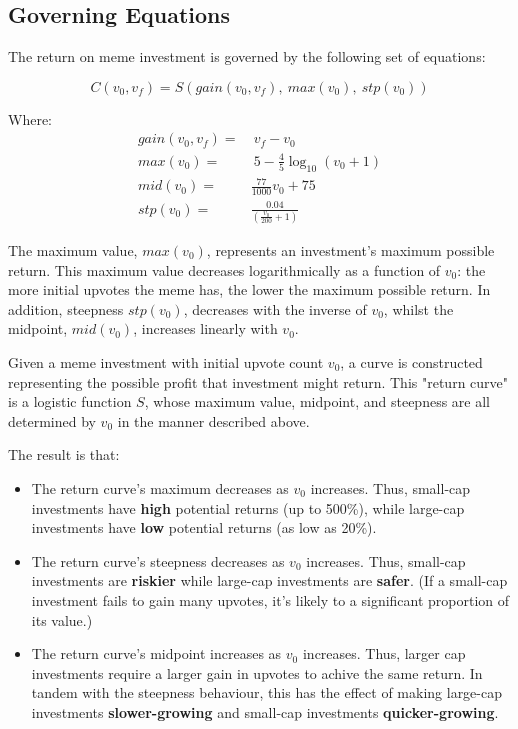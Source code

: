\documentclass[a4paper, 12pt]{article}
\begin{document}
\subsection*{Governing Equations}
\label{sec:orgf9efb6d}

The return on meme investment is governed by the following set of equations:

\begin{equation*}
C(v_0, v_f) = S(gain(v_0, v_f),\ max(v_0),\ stp(v_0))
\end{equation*}

Where:
\begin{align*}
gain(v_0, v_f) =& \ v_f - v_0\\
max(v_0) =& \ 5 - \frac{4}{5} \log_{10}(v_0 + 1)\\
mid(v_0) =& \frac{77}{1000}v_0 + 75 \\
stp(v_0) =& \frac{0.04}{\left( \frac{v_0}{200} + 1 \right)}  
\end{align*}

The maximum value, \(max(v_0)\), represents an investment's maximum possible return. This maximum 
value decreases logarithmically as a function of \(v_0\): the more initial upvotes the meme has, the lower 
the maximum possible return. In addition, steepness \(stp(v_0)\), decreases with the inverse of \(v_0\), 
whilst the midpoint, \(mid(v_0)\), increases linearly with \(v_0\). 

Given a meme investment with initial upvote count \(v_0\), a curve is constructed representing
the possible profit that investment might return. This "return curve" is a logistic function
\(S\), whose maximum value, midpoint, and steepness are all determined by \(v_0\) in
the manner described above. 

The result is that:

\begin{itemize}
\item The return curve's maximum decreases as \(v_0\) increases. Thus, small-cap
investments have \textbf{high} potential returns (up to 500\%), while large-cap
investments have \textbf{low} potential returns (as low as 20\%).

\item The return curve's steepness decreases as \(v_0\) increases. Thus, small-cap
investments are \textbf{riskier} while large-cap investments are \textbf{safer}. (If a
small-cap investment fails to gain many upvotes, it's likely to a significant
proportion of its value.)

\item The return curve's midpoint increases as \(v_0\) increases. Thus, larger cap
investments require a larger gain in upvotes to achive the same return. In
tandem with the steepness behaviour, this has the effect of making large-cap
investments \textbf{slower-growing} and small-cap investments \textbf{quicker-growing}.
\end{itemize}
\end{document}
